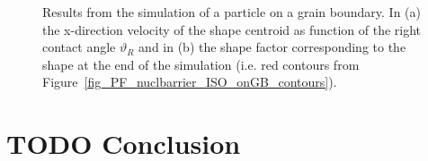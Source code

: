 \begin{figure}
	\centering
	\caption{Results from the simulation of a particle on a grain boundary. In (a) the x-direction velocity of the shape centroid as function of the right contact angle $\vartheta_R$ and in (b) the shape factor corresponding to the shape at the end of the simulation (i.e. red contours from Figure~\ref{fig_PF_nuclbarrier_ISO_onGB_contours}).}
	\label{fig_PF_nuclbarrier_ISO_onGB_results}
\end{figure}

\section{TODO Conclusion}
 

\cleardoublepage

